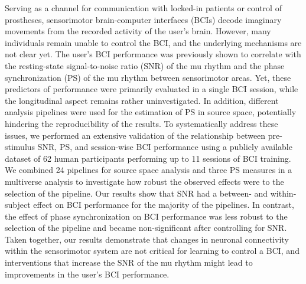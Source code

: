 Serving as a channel for communication with locked-in patients or control of prostheses, sensorimotor brain-computer interfaces (BCIs) decode imaginary movements from the recorded activity of the user's brain. However, many individuals remain unable to control the BCI, and the underlying mechanisms are not clear yet. The user's BCI performance was previously shown to correlate with the resting-state signal-to-noise ratio (SNR) of the mu rhythm and the phase synchronization (PS) of the mu rhythm between sensorimotor areas. Yet, these predictors of performance were primarily evaluated in a single BCI session, while the longitudinal aspect remains rather uninvestigated. In addition, different analysis pipelines were used for the estimation of PS in source space, potentially hindering the reproducibility of the results. To systematically address these issues, we performed an extensive validation of the relationship between pre-stimulus SNR, PS, and session-wise BCI performance using a publicly available dataset of 62 human participants performing up to 11 sessions of BCI training. We combined 24 pipelines for source space analysis and three PS measures in a multiverse analysis to investigate how robust the observed effects were to the selection of the pipeline. Our results show that SNR had a between- and within-subject effect on BCI performance for the majority of the pipelines. In contrast, the effect of phase synchronization on BCI performance was less robust to the selection of the pipeline and became non-significant after controlling for SNR. Taken together, our results demonstrate that changes in neuronal connectivity within the sensorimotor system are not critical for learning to control a BCI, and interventions that increase the SNR of the mu rhythm might lead to improvements in the user's BCI performance.
